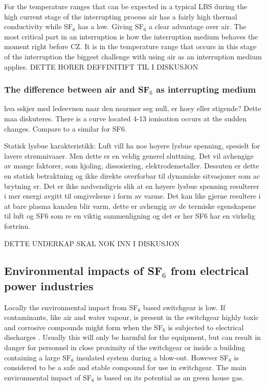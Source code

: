 \documentclass[10pt,a4paper]{article} %
\begin{document}
For the temperature ranges that can be expected in a typical LBS during the high current stage of the interrupting process air has a fairly high thermal conductivity while SF$_6$ has a low. Giving SF$_6$ a clear advantage over air. The most critical part in an interruption is how the interruption medium behaves the moment right before CZ. It is in the temperature range that occurs in this stage of the interruption the biggest challenge with using air as an interruption medium applies. DETTE HORER DEFFINITIFT TIL I DISKUSJON

\subsubsection{The difference between air and SF$_6$ as interrupting medium} \label{sec:airandsf}
hva sskjer med ledeevnen naar den nearmer seg null, er hoey eller stigende? Dette maa diskuteres.
There is a curve located 4-13 ionisation occurs at the sudden changes. Compare to a similar for SF6.

Statisk lysbue karakteristikk: Luft vill ha noe hoyere lysbue spenning, spesielt for lavere strømnivaaer. Men dette er en veldig generel sluttning. Det vil avhengige av mange faktorer, som kjoling, dissosiering, elektrodemetaller. Dessuten er dette en statisk betraktning og ikke direkte overforbar til dynamiske sitvasjoner som ac brytning er. Det er ikke nødvendigvis slik at en høyere lysbue spenning resulterer i mer energi avgitt til omgivelsene i form av varme. Det kan like gjerne resultere i at bare plasma kanalen blir varm, dette er avhengig av de termiske egenskapene til luft og SF6 som re en viktig sammenligning og det er her SF6 har en virkelig fortrinn.

DETTE UNDERKAP SKAL NOK INN I DISKUSJON

\newpage
\subsection{Environmental impacts of SF$_6$ from electrical power industries}
Locally the environmental impact from SF$_6$ based switchgear is low. If contaminants, like air and water vapour, is present in the switchgear highly toxic and corrosive compounds might form when the SF$_6$ is subjected to electrical discharges \cite{bib:SF6PI}. Usually this will only be harmful for the equipment, but can result in danger for personnel in close proximity of the switchgear or inside a building containing a large SF$_6$ insulated system during a blow-out. However SF$_6$ is considered to be a safe and stable compound for use in switchgear. The main environmental impact of SF$_6$ is based on its potential as an green house gas.
\end{document}
